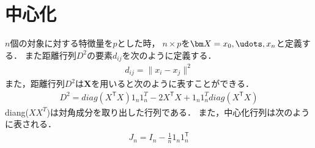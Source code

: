 \documentclass{jsarticle}
\newcommand{\T}{\mathsf{T}}
\begin{document}
\section{中心化}
$n$個の対象に対する特徴量を$p$とした時，$n \times p$を$\bm X = x_0,\udots,x_n$と定義する．
また距離行列$D^2$の要素$d_{ij}$を次のように定義する．
\begin{eqnarray}
    d_{ij}=\| x_i - x_j\|^2
\end{eqnarray}
また，距離行列$D^2$は$\bm X$を用いると次のように表すことができる．
\begin{eqnarray}
    D^2 = diag(X^\T X)1_n1_n^T - 2X^\T X + 1_n1_n^T diag(X^\T X)
\end{eqnarray}
diang($X X^T$)は対角成分を取り出した行列である．
また，中心化行列は次のように表される．
\begin{eqnarray}
    J_n =   I_n - \frac{1}{n}1_n 1_n^\T
\end{eqnarray}
\end{document}
